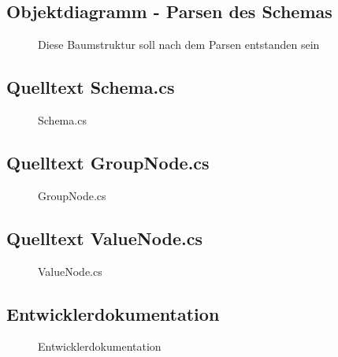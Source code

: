 \subsection{Objektdiagramm - Parsen des Schemas}
\label{app:ObjDiagramsdiagrammSchemaParsen}
\begin{figure}[htb]
\centering
{}
\caption{Diese Baumstruktur soll nach dem Parsen entstanden sein}
\end{figure}
\clearpage




\subsection{Quelltext Schema.cs}
\label{app:SchemaSrc}
\begin{figure}[htb]
\centering
{}
\caption{Schema.cs}
\end{figure}
\clearpage




\subsection{Quelltext GroupNode.cs}
\label{app:GroupNodeSrc}
\begin{figure}[htb]
\centering
{}
\caption{GroupNode.cs}
\end{figure}
\clearpage


\subsection{Quelltext ValueNode.cs}
\label{app:ValueNodeSrc}
\begin{figure}[htb]
\centering
{}
\caption{ValueNode.cs}
\end{figure}
\clearpage


\subsection{Entwicklerdokumentation}
\label{app:Entwicklerdokumentation}
\begin{figure}[htb]
\centering
{}
\caption{Entwicklerdokumentation}
\end{figure}
\clearpage

